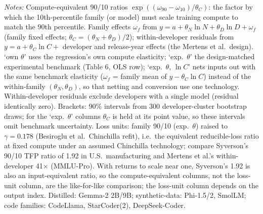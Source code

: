 \begin{table}[!htbp]
\begin{threeparttable}
\begin{tablenotes}[flushleft]
\item \textit{Notes:} Compute-equivalent 90/10 ratios $\exp((\omega_{90}-\omega_{10})/\theta_C)$: the factor by which the 10th-percentile family (or model) must scale training compute to match the 90th percentile. Family effects $\omega_f$ from $y=a+\theta_N\ln N+\theta_D\ln D+\omega_f$ (family fixed effects; $\theta_C=(\theta_N+\theta_D)/2$); within-developer residuals from $y=a+\theta_C\ln C+$ developer and release-year effects (the Mertens et al.\ design). `own $\theta$' uses the regression's own compute elasticity; `exp.\ $\theta$' the design-matched experimental benchmark (Table 6, OLS row); `exp.\ $\theta$, $\ln C$' nets inputs out with the same benchmark elasticity ($\omega_f$ = family mean of $y-\theta_C\ln C$) instead of the within-family $(\theta_N,\theta_D)$, so that netting and conversion use one technology. Within-developer residuals exclude developers with a single model (residual identically zero). Brackets: 90\% intervals from 300 developer-cluster bootstrap draws; for the `exp.\ $\theta$' columns $\theta_C$ is held at its point value, so these intervals omit benchmark uncertainty. Loss units: family 90/10 (exp.\ $\theta$) raised to $\gamma=0.178$ (Besiroglu et al.\ Chinchilla refit), i.e.\ the equivalent reducible-loss ratio at fixed compute under an assumed Chinchilla technology; compare Syverson's 90/10 TFP ratio of 1.92 in U.S.\ manufacturing and Mertens et al.'s within-developer 41$\times$ (MMLU-Pro). With returns to scale near one, Syverson's 1.92 is also an input-equivalent ratio, so the compute-equivalent columns, not the loss-unit column, are the like-for-like comparison; the loss-unit column depends on the output index. Distilled: Gemma-2 2B/9B; synthetic-data: Phi-1.5/2, SmolLM; code families: CodeLlama, StarCoder(2), DeepSeek-Coder.
\end{tablenotes}
\end{threeparttable}
\end{table}
